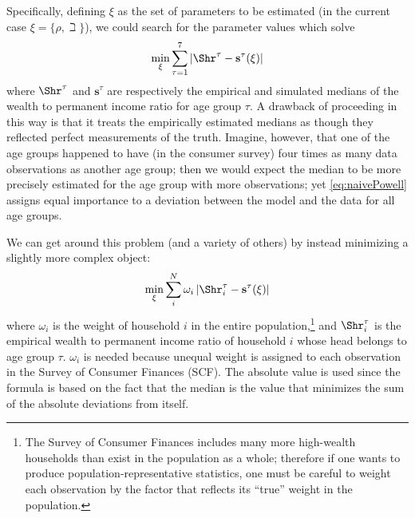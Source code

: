 \documentclass[titlepage, headings=optiontotocandhead]{Resources/texmf-local/tex/latex/econtex}
\begin{document}
Specifically, defining $\xi$ as the set of parameters
to be estimated (in the current case $\xi =\{\rho ,\beth\}$), we could search for
the parameter values which solve
  \begin{equation}
    \begin{gathered}
      \begin{aligned}
        \min_{\xi} \sum_{\tau=1}^{7} |\Shr^{\tau} -\mathbf{s}^{\tau}(\xi)|  \label{eq:naivePowell}
      \end{aligned}
    \end{gathered}
  \end{equation}
where $\Shr^{\tau }$ and $\mathbf{s}^{\tau}$ are respectively the empirical
and simulated medians of the wealth to permanent income ratio for age group $\tau$.
A drawback of proceeding in this way is that it treats the empirically
estimated medians as though they reflected perfect measurements of the
truth. Imagine, however, that one of the age groups happened to have
(in the consumer survey) four times as many data observations as
another age group; then we would expect the median to be more
precisely estimated for the age group with more observations; yet
\eqref{eq:naivePowell} assigns equal importance to a deviation between
the model and the data for all age groups.

We can get around this problem (and a variety of others) by instead minimizing a slightly more complex object:
  \begin{equation}
    \min_{\xi}\sum_{i}^{N}\omega _{i}\left|\Shr_{i}^{\tau }-\mathbf{s}^{\tau}(\xi )\right|\label{eq:StructEstim}
  \end{equation}
where $\omega_{i}$ is the weight of household $i$ in the entire
population,\footnote{The Survey of Consumer Finances includes many
  more high-wealth households than exist in the population as a whole;
  therefore if one wants to produce population-representative
  statistics, one must be careful to weight each observation by the
  factor that reflects its ``true'' weight in the population.} and
$\Shr_{i}^{\tau }$ is the empirical wealth to permanent income
ratio of household $i$ whose head belongs to age group
$\tau$. $\omega _{i}$ is needed because unequal weight is assigned to
each observation in the Survey of Consumer Finances (SCF). The
absolute value is used since the formula is based on the fact that the
median is the value that minimizes the sum of the absolute deviations
from itself.

\end{document}
